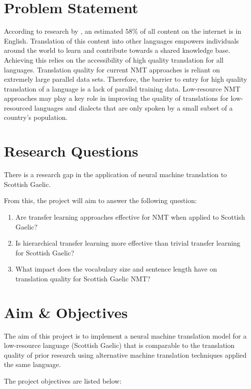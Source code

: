 \section{Problem Statement}
According to research by \cite{w3_internet_2020}, an estimated $58$\% of all content on the internet is in English. Translation of this content into other languages empowers individuals around the world to learn and contribute towards a shared knowledge base. Achieving this relies on the accessibility of high quality translation for all languages. Translation quality for current \acrshort{NMT} approaches is reliant on extremely large parallel data sets. Therefore, the barrier to entry for high quality translation of a language is a lack of parallel training data. Low-resource \acrshort{NMT} approaches may play a key role in improving the quality of translations for low-resourced languages and dialects that are only spoken by a small subset of a country's population.


\section{Research Questions}
There is a research gap in the application of neural machine translation to Scottish Gaelic.

From this, the project will aim to answer the following question:

\begin{enumerate}
    \item Are transfer learning approaches effective for \acrshort{NMT} when applied to Scottish Gaelic?
    \item Is hierarchical transfer learning more effective than trivial transfer learning for Scottish Gaelic?
    \item What impact does the vocabulary size and sentence length have on translation quality for Scottish Gaelic \acrshort{NMT}?
    
\end{enumerate}

\section{Aim \& Objectives}
The aim of this project is to implement a neural machine translation model for a low-resource language (Scottish Gaelic) that is comparable to the translation quality of prior research using alternative machine translation techniques applied the same language.

The project objectives are listed below:

